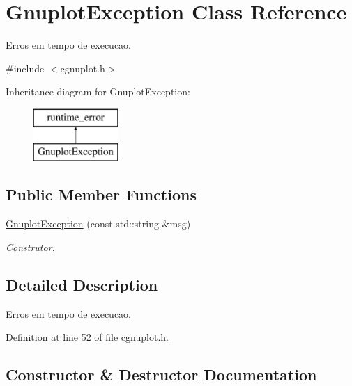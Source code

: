 \hypertarget{class_gnuplot_exception}{}\section{Gnuplot\+Exception Class Reference}
\label{class_gnuplot_exception}


Erros em tempo de execucao.  




{\ttfamily \#include $<$cgnuplot.\+h$>$}

Inheritance diagram for Gnuplot\+Exception\+:\begin{figure}[H]
\begin{center}
\leavevmode
\includegraphics[height=2.000000cm]{class_gnuplot_exception}
\end{center}
\end{figure}
\subsection*{Public Member Functions}
\begin{DoxyCompactItemize}
\item 
\hyperlink{class_gnuplot_exception_a8b324a9ef4d3f75079d41ecd61c62d44}{Gnuplot\+Exception} (const std\+::string \&msg)
\begin{DoxyCompactList}\small\item\em Construtor. \end{DoxyCompactList}\end{DoxyCompactItemize}


\subsection{Detailed Description}
Erros em tempo de execucao. 

Definition at line 52 of file cgnuplot.\+h.



\subsection{Constructor \& Destructor Documentation}
\mbox{\label{class_gnuplot_exception_a8b324a9ef4d3f75079d41ecd61c62d44}} 
